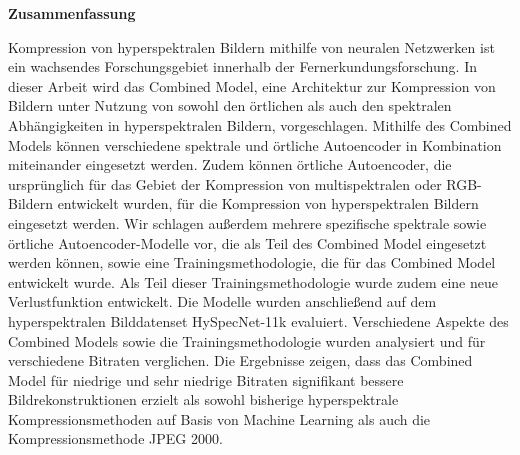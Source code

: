 \thispagestyle{empty}
\vspace*{1.4cm}

\begin{center}
    {\Large \textbf{Zusammenfassung}}
\end{center}

\vspace*{0.5cm}

\noindent 
Kompression von hyperspektralen Bildern mithilfe von neuralen Netzwerken ist ein wachsendes Forschungsgebiet innerhalb der Fernerkundungsforschung. In dieser Arbeit wird das Combined Model, eine Architektur zur Kompression von Bildern unter Nutzung von sowohl den örtlichen als auch den spektralen Abhängigkeiten in hyperspektralen Bildern, vorgeschlagen. Mithilfe des Combined Models können verschiedene spektrale und örtliche Autoencoder in Kombination miteinander eingesetzt werden. Zudem können örtliche Autoencoder, die ursprünglich für das Gebiet der Kompression von multispektralen oder RGB-Bildern entwickelt wurden, für die Kompression von hyperspektralen Bildern eingesetzt werden. Wir schlagen außerdem mehrere spezifische spektrale sowie örtliche Autoencoder-Modelle vor, die als Teil des Combined Model eingesetzt werden können, sowie eine Trainingsmethodologie, die für das Combined Model entwickelt wurde. Als Teil dieser Trainingsmethodologie wurde zudem eine neue Verlustfunktion entwickelt. Die Modelle wurden anschließend auf dem hyperspektralen Bilddatenset HySpecNet-11k evaluiert. Verschiedene Aspekte des Combined Models sowie die Trainingsmethodologie wurden analysiert und für verschiedene Bitraten verglichen. Die Ergebnisse zeigen, dass das Combined Model für niedrige und sehr niedrige Bitraten signifikant bessere Bildrekonstruktionen erzielt als sowohl bisherige hyperspektrale Kompressionsmethoden auf Basis von Machine Learning als auch die Kompressionsmethode JPEG 2000.